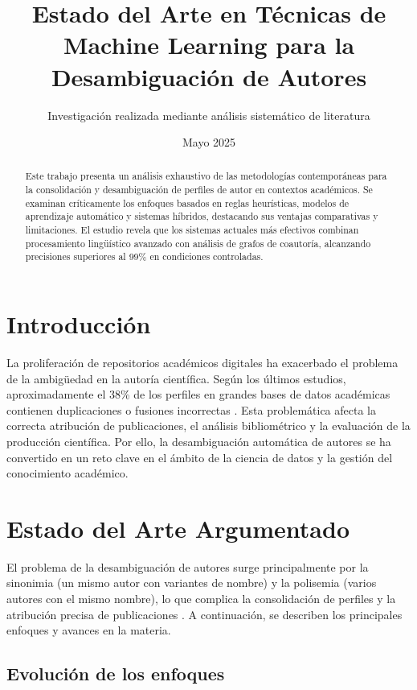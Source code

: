 \documentclass{article}
\title{Estado del Arte en Técnicas de Machine Learning para la Desambiguación de Autores}
\author{Investigación realizada mediante análisis sistemático de literatura}
\date{Mayo 2025}
\begin{document}
\maketitle

\begin{abstract}
Este trabajo presenta un análisis exhaustivo de las metodologías contemporáneas para la consolidación y desambiguación de perfiles de autor en contextos académicos. Se examinan críticamente los enfoques basados en reglas heurísticas, modelos de aprendizaje automático y sistemas híbridos, destacando sus ventajas comparativas y limitaciones. El estudio revela que los sistemas actuales más efectivos combinan procesamiento lingüístico avanzado con análisis de grafos de coautoría, alcanzando precisiones superiores al 99\% en condiciones controladas.
\end{abstract}

\tableofcontents

\section{Introducción}
La proliferación de repositorios académicos digitales ha exacerbado el problema de la ambigüedad en la autoría científica. Según los últimos estudios, aproximadamente el 38\% de los perfiles en grandes bases de datos académicas contienen duplicaciones o fusiones incorrectas \cite{Ferreira2012}. Esta problemática afecta la correcta atribución de publicaciones, el análisis bibliométrico y la evaluación de la producción científica. Por ello, la desambiguación automática de autores se ha convertido en un reto clave en el ámbito de la ciencia de datos y la gestión del conocimiento académico.

\section{Estado del Arte Argumentado}

El problema de la desambiguación de autores surge principalmente por la sinonimia (un mismo autor con variantes de nombre) y la polisemia (varios autores con el mismo nombre), lo que complica la consolidación de perfiles y la atribución precisa de publicaciones \cite{Ferreira2012,Canteros2020}. A continuación, se describen los principales enfoques y avances en la materia.

\subsection{Evolución de los enfoques}
\end{document}
